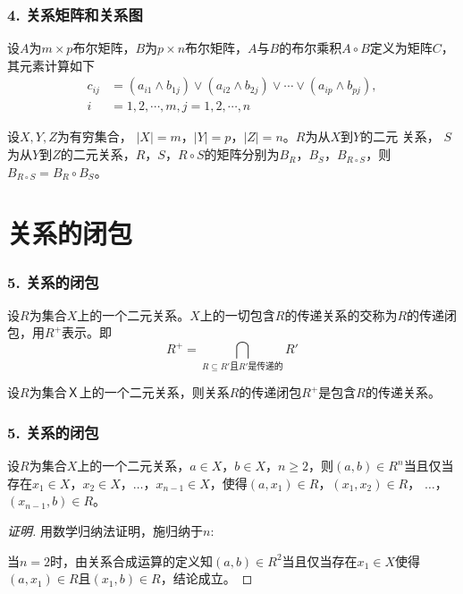 \documentclass{beamer}
\begin{document}
\begin{CJK*}{UTF8}{gbsn}
\begin{frame}
  \frametitle{4. 关系矩阵和关系图}
  \begin{Def}
    设$A$为$m\times p$布尔矩阵，$B$为$p \times n$布尔矩阵，$A$与$B$的布尔乘积$A \circ B$定义为矩阵$C$，其元素计算如下
    \begin{align*}
      c_{ij} &= (a_{i1}\land b_{1j}) \lor (a_{i2} \land b_{2j}) \lor \cdots \lor (a_{ip} \land b_{pj}), \\
      i &= 1,2,\cdots, m, j = 1,2,\cdots, n
    \end{align*}
  \end{Def}\pause
  \begin{Thm}
    设$X, Y, Z$为有穷集合， $|X| =m$，$|Y|=p$，$|Z| = n$。$R$为从$X$到$Y$的二元
    关系， $S$为从$Y$到$Z$的二元关系，$R$，$S$，$R \circ S$的矩阵分别为$B_{R}$，$B_{S}$，$B_{R\circ S}$，则$B_{R\circ S} = B_R \circ B_S$。
  \end{Thm}
\end{frame}

\section{关系的闭包}
\begin{frame}
  \frametitle{5. 关系的闭包}
  \begin{Def}
    设$R$为集合$X$上的一个二元关系。$X$上的一切包含$R$的传递关系的交称为$R$的传递闭包，用$R^+$表示。即
    \begin{equation*}
      R^+ = \bigcap_{R \subseteq R' \text{且} R'\text{是传递的}}R'
    \end{equation*}
  \end{Def}
  \pause
  \begin{Thm}
    设$R$为集合Ｘ上的一个二元关系，则关系$R$的传递闭包$R^+$是包含$R$的传递关系。
  \end{Thm}
\end{frame}
\begin{frame}
  \frametitle{5. 关系的闭包}
  \begin{Thm}
    设$R$为集合$X$上的一个二元关系，$a \in X$，$b \in X$，$n \geq 2$，则$(a,b) \in R^n$当且仅当存在$x_1\in X$，$x_2\in X$，$\ldots$，$x_{n-1}\in X$，使得$(a, x_1) \in R$，$(x_1, x_2)\in R$，  $\ldots$， $(x_{n-1}, b)\in R$。
  \end{Thm}
  \begin{proof}[证明]
  \pause 用数学归纳法证明，施归纳于$n$:

  \pause 当$n=2$时，由关系合成运算的定义知$(a,b)\in R^2$当且仅当存在$x_1\in X$使得$(a,x_1)\in R$且$(x_1, b)\in R$，结论成立。


\end{proof}
\end{frame}
\end{CJK*}
\end{document}
